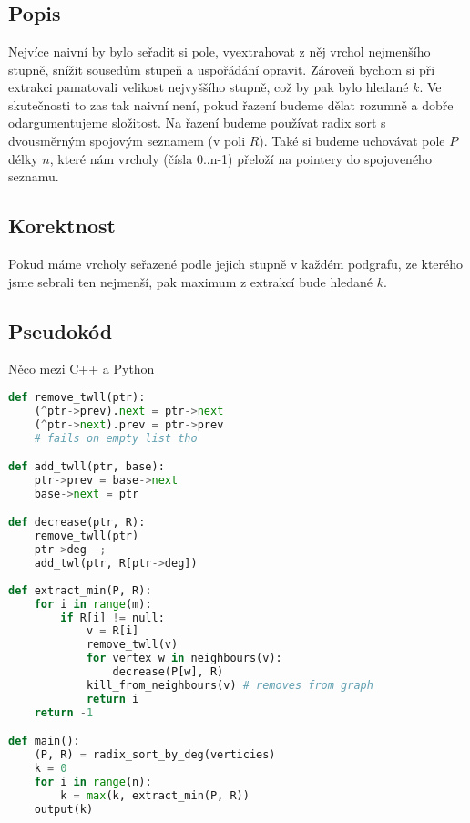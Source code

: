 \documentclass[a4paper]{article}
\begin{document}
\text{}\vspace{-0.5cm}
{\fontsize{12}{15}\selectfont \hspace{-0.5cm}}

\section{}
\subsection{Popis}
Nejvíce naivní by bylo seřadit si pole, vyextrahovat z něj vrchol nejmenšího stupně, snížit sousedům stupeň a uspořádání opravit. Zároveň bychom si při extrakci pamatovali velikost nejvyššího stupně, což by pak bylo hledané $k$. Ve skutečnosti to zas tak naivní není, pokud řazení budeme dělat rozumně a dobře odargumentujeme složitost.  Na řazení budeme používat radix sort s dvousměrným spojovým seznamem (v poli $R$). Také si budeme uchovávat pole $P$ délky $n$, které nám vrcholy (čísla 0..n-1) přeloží na pointery do spojoveného seznamu.

\subsection{Korektnost}
Pokud máme vrcholy seřazené podle jejich stupně v každém podgrafu, ze kterého jsme sebrali ten nejmenší, pak maximum z extrakcí bude hledané $k$.

\subsection{Pseudokód}
Něco mezi C++ a Python \smiley{}
\begin{lstlisting}[language=Python]
def remove_twll(ptr):
    (^ptr->prev).next = ptr->next
    (^ptr->next).prev = ptr->prev
    # fails on empty list tho

def add_twll(ptr, base):
    ptr->prev = base->next
    base->next = ptr

def decrease(ptr, R):
    remove_twll(ptr)
    ptr->deg--;
    add_twl(ptr, R[ptr->deg])
	
def extract_min(P, R):
    for i in range(m):
        if R[i] != null:
            v = R[i]
            remove_twll(v)
            for vertex w in neighbours(v):
                decrease(P[w], R)
            kill_from_neighbours(v) # removes from graph
            return i
    return -1

def main():
    (P, R) = radix_sort_by_deg(verticies)
    k = 0
    for i in range(n):
        k = max(k, extract_min(P, R))
    output(k)
\end{lstlisting}
\end{document}
